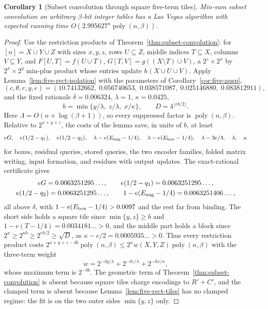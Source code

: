 \documentclass[11pt]{article}
\newtheorem{corollary}[theorem]{Corollary}
\begin{document}
\begin{corollary}[Subset convolution through square five-term tiles]
\label{cor:subset-five}
Min-sum subset convolution on arbitrary $\beta$-bit integer tables has a
Las Vegas algorithm with expected running time
$O(2.995627^n\operatorname{poly}(n,\beta))$.
\end{corollary}
\begin{proof}
Use the restriction products of Theorem~\ref{thm:subset-convolution}:
for $[n]=X\mathbin{\dot\cup}Y\mathbin{\dot\cup}Z$ with sizes $x,y,z$,
rows $U\subseteq Z$, middle indices $T\subseteq X$, columns
$V\subseteq Y$, and $F[U,T]=f(U\cup T)$, $G[T,V]=g((X\setminus T)\cup V)$,
a $2^z\times2^x$ by $2^x\times2^y$ min-plus product whose entries update
$h(X\cup U\cup V)$. Apply Lemma~\ref{lem:five-rect-isolation} with the
parameters of Corollary~\ref{cor:five-apsp},
\[
(c,\theta,r,y,e)=(10.74132662,\;0.056740653,\;0.038571087,\;
0.025146880,\;0.083812911),
\]
and the fixed rationals $\delta=0.006324$, $\lambda=1$, $\kappa=0.0425$,
\[
 b=\min\{y/\lambda,\;z/\lambda,\;x/\kappa\},\qquad
 D=4^{\lfloor eb/2\rfloor}.
\]
Here $\Lambda=O(n+\log(\beta+1))$, so every suppressed factor is
$\operatorname{poly}(n,\beta)$. Relative to $2^{x+y+z}$, the costs of the
lemma save, in units of $b$, at least
\[
 eG,\quad e(1/2-q_1),\quad e(1/2-q_2),\quad
 \lambda-e(E_{\rm aug}-1/4),\quad \lambda-e(E_{\rm box}-1/4),\quad
 \lambda-3e/4,\quad \lambda,\quad \kappa
\]
for boxes, residual queries, stored queries, the two encoder families,
folded matrix writing, input formation, and residues with output
updates. The exact-rational certificate gives
\[
\begin{gathered}
 eG=0.0063251295\ldots,\qquad e(1/2-q_1)=0.0063251295\ldots,\\
 e(1/2-q_2)=0.0063251295\ldots,\qquad
 1-e(E_{\rm aug}-1/4)=0.0063251406\ldots,
\end{gathered}
\]
all above $\delta$, with $1-e(E_{\rm box}-1/4)>0.0097$ and the rest far
from binding. The short side holds a square tile since
$\min\{y,z\}\ge b$ and $1-e(T-1/4)=0.0034181\ldots>0$, and the middle
part holds a block since $2^x\ge2^{\kappa b}\ge2^{eb/2}\ge\sqrt D$, as
$\kappa-e/2=0.0005935\ldots>0$. Thus every restriction product costs
$2^{x+y+z-\delta b}\operatorname{poly}(n,\beta)\le2^nw(X,Y,Z)
\operatorname{poly}(n,\beta)$ with the three-term weight
\[
 w=2^{-\delta y/\lambda}+2^{-\delta z/\lambda}+2^{-\delta x/\kappa},
\]
whose maximum term is $2^{-\delta b}$. The geometric term of
Theorem~\ref{thm:subset-convolution} is absent because square tiles
charge encodings to $R'+C'$, and the clamped term is absent because
Lemma~\ref{lem:five-rect-tiles} has no clamped regime: the fit is on
the two outer sides $\min\{y,z\}$ only.


\end{proof}
\end{document}
